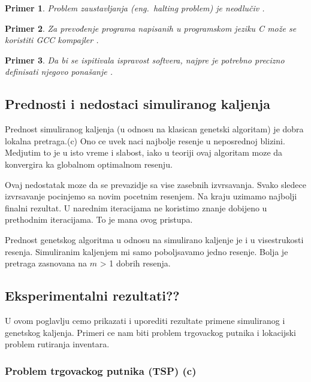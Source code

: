 \documentclass[a4paper]{article}
\newtheorem{primer}{Primer}[section]
\begin{document}
\begin{primer}
Problem zaustavljanja (eng.~{\em halting problem}) je neodlučiv \cite{haltingproblem}.
\end{primer}

\begin{primer}
Za prevođenje programa napisanih u programskom jeziku C može se koristiti GCC kompajler \cite{gcc}.
\end{primer}

\begin{primer}
 Da bi se ispitivala ispravost softvera, najpre je potrebno precizno definisati njegovo ponašanje \cite{laski2009software}. 
\end{primer}

\subsection{Prednosti i nedostaci simuliranog kaljenja}

Prednost simuliranog kaljenja (u odnosu na klasican genetski algoritam) je dobra lokalna pretraga.(c) Ono ce uvek naci najbolje resenje u neposrednoj blizini. Medjutim to je u isto vreme i slabost, iako u teoriji ovaj algoritam moze da konvergira ka globalnom optimalnom resenju. \par
Ovaj nedostatak moze da se prevazidje sa vise zasebnih izvrsavanja. Svako sledece izvrsavanje pocinjemo sa novim pocetnim resenjem. Na kraju uzimamo najbolji finalni rezultat. U narednim iteracijama ne koristimo znanje dobijeno u prethodnim iteracijama. To je mana ovog pristupa. \par
Prednost genetskog algoritma u odnosu na simulirano kaljenje je i u visestrukosti resenja. Simuliranim kaljenjem mi samo poboljsavamo jedno resenje. Bolja je pretraga zasnovana na $m$ > 1 dobrih resenja.

\subsection{Eksperimentalni rezultati??}

U ovom poglavlju cemo prikazati i uporediti rezultate primene simuliranog i genetskog kaljenja. Primeri ce nam biti problem trgovackog putnika i lokacijski problem rutiranja inventara.  

\subsubsection{Problem trgovackog putnika (TSP) (c)}
\end{document}
